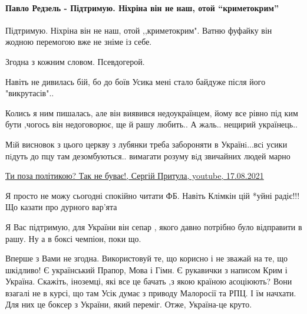  
 
 
 
 
\paragraph{Павло Редзель - Підтримую. Ніхріна він не наш, отой \enquote{криметокрим}}
\label{sec:26_09_2021.fb.bryhar_sergej.1.usik_adept_malorossia_kakajaraznica.cmt.2}

\begin{itemize} %
Підтримую. Ніхріна він не наш, отой ,,криметокрим". Ватню фуфайку він жодною перемогою вже не зніме із себе.

Згодна з кожним словом. Псевдогерой.

Навіть не дивилась бій, бо до боїв Усика мені стало байдуже після його "викрутасів"..


Колись я ним пишалась, але він виявився недоукраїнцем, йому все рівно під ким
бути ,чогось він недоговорює, ще й рашу любить.. А жаль.. нещирий українець..


Мiй висновок з цього церкву з лубянки треба забороняти в Українi...всi усики
пiдуть до пцу там дезомбуються.. вимагати розуму вiд звичайних людей марно


\href{https://youtu.be/YEFdcAAMBNU}{%
Ти поза політикою? Так не буває!, Сергій Притула, youtube, 17.08.2021%
}

Я просто не можу сьогодні спокійно читати ФБ. Навіть Клімкін цій *уйні радіє!!!Що казати про дурного вар'ята

Я Вас підтримую, для України він сепар , якого давно потрібно було відправити в рашу. Ну а в боксі чемпіон, поки що.


Вперше з Вами не згодна. Використовуй те, що корисно і не зважай на те, що
шкідливо! Є український Прапор, Мова і Гімн. Є рукавички з написом Крим і
Україна. Скажіть, іноземці, які все це бачать ,з якою країною асоціюють? Вони
взагалі не в курсі, що там Усік думає з приводу Малоросії та РПЦ. І їм начхати.
Для них це боксер з України, який переміг. Отже, Україна-це круто.


\end{itemize}
